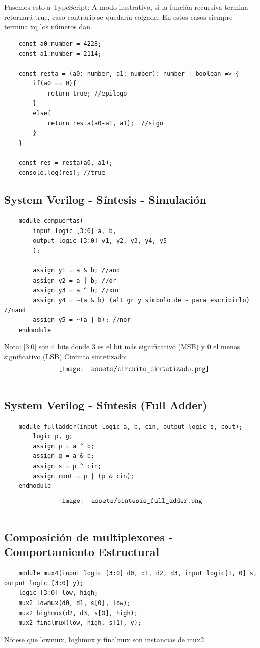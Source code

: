 \documentclass[10pt,a4paper]{article}
\begin{document}
Pasemos esto a TypeScript: A modo ilustrativo, si la función recursiva termina retornará true, caso contrario se quedaría colgada. En estos casos siempre termina xq los números dan.
\begin{lstlisting}
    const a0:number = 4228;
    const a1:number = 2114;

    const resta = (a0: number, a1: number): number | boolean => {
        if(a0 == 0){
            return true; //epilogo
        }
        else{
            return resta(a0-a1, a1);  //sigo
        }
    }

    const res = resta(a0, a1);
    console.log(res); //true
\end{lstlisting}
\subsection*{System Verilog - Síntesis - Simulación}
\label{subsec:SVL_S_S}
\begin{lstlisting}
    module compuertas(
        input logic [3:0] a, b,
        output logic [3:0] y1, y2, y3, y4, y5
        );

        assign y1 = a & b; //and
        assign y2 = a | b; //or
        assign y3 = a ^ b; //xor
        assign y4 = ~(a & b) (alt gr y simbolo de ~ para escribirlo) //nand
        assign y5 = ~(a | b); //nor
    endmodule 
\end{lstlisting}
Nota: [3:0] son 4 bits donde 3 es el bit más significativo (MSB) y 0 el menos significativo (LSB)
Circuito sintetizado:
\[\begin{minipage}[b]{0.6\textwidth}
    \texttt{[image: assets/circuito\_sintetizado.png]}
    \label{fig:circuito_sintetizado}
\end{minipage}\] 
\subsection*{System Verilog - Síntesis (Full Adder)}
\label{subsec:SVL_FullAdder}
\begin{lstlisting}
    module fulladder(input logic a, b, cin, output logic s, cout);
        logic p, g; 
        assign p = a ^ b;
        assign g = a & b;
        assign s = p ^ cin;
        assign cout = p | (p & cin);
    endmodule
\end{lstlisting}
\[\begin{minipage}[b]{0.6\textwidth}
\texttt{[image: assets/sintesis\_full\_adder.png]}
\label{fig:sintesis_full_adder}
\end{minipage}\] 
\subsection*{Composición de multiplexores - Comportamiento Estructural}
\label{subsec:SVL_comp}
\begin{lstlisting}
    module mux4(input logic [3:0] d0, d1, d2, d3, input logic[1, 0] s, output logic [3:0] y);
    logic [3:0] low, high;
    mux2 lowmux(d0, d1, s[0], low);
    mux2 highmux(d2, d3, s[0], high);
    mux2 finalmux(low, high, s[1], y);
\end{lstlisting}
Nótese que lowmux, highmux y finalmux son instancias de mux2.
\end{document}
